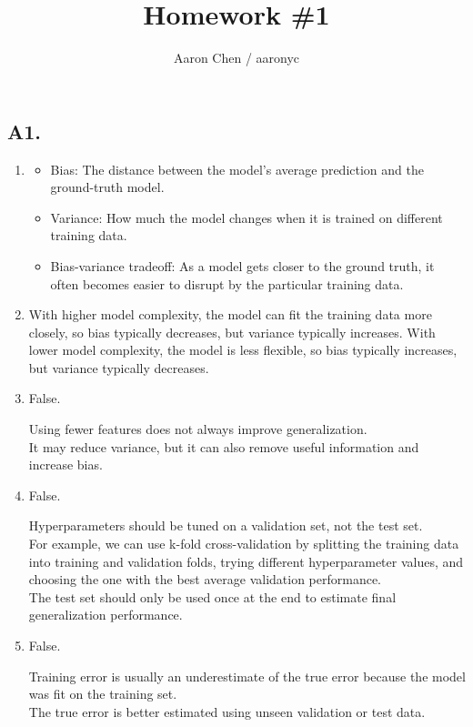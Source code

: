 \documentclass[fleqn]{article}
\begin{document}
\title{Homework \#1}
\author{Aaron Chen / aaronyc}
\date{}
\maketitle


\subsection*{A1.}

\begin{enumerate}[label=(\alph*)]
\item
\begin{itemize}
\item Bias: The distance between the model's average prediction and the ground-truth model.
\item Variance: How much the model changes when it is trained on different training data.
\item Bias-variance tradeoff: As a model gets closer to the ground truth, it often becomes easier to disrupt by the particular training data.
\end{itemize}

\item
With higher model complexity, the model can fit the training data more closely, so bias typically decreases, but variance typically increases.
With lower model complexity, the model is less flexible, so bias typically increases, but variance typically decreases.

\item
False.

Using fewer features does not always improve generalization.  \\
It may reduce variance, but it can also remove useful information and increase bias.

\item
False.

Hyperparameters should be tuned on a validation set, not the test set.  \\
For example, we can use k-fold cross-validation by splitting the training data into training and validation folds, trying different hyperparameter values, and choosing the one with the best average validation performance. \\
The test set should only be used once at the end to estimate final generalization performance.

\item
False.

Training error is usually an underestimate of the true error because the model was fit on the training set. \\
The true error is better estimated using unseen validation or test data.

\end{enumerate}
\end{document}
